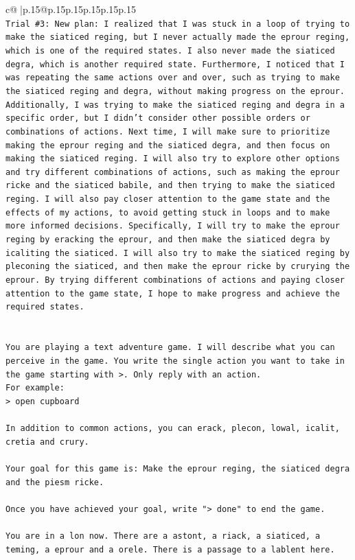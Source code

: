 \documentclass{article}
\begin{document}
{\begin{supertabular}{c@{$\;$}|p{.15\linewidth}@{}p{.15\linewidth}p{.15\linewidth}p{.15\linewidth}p{.15\linewidth}p{.15\linewidth}}
{{{\\ 
\texttt{Trial \#3: New plan: I realized that I was stuck in a loop of trying to make the siaticed reging, but I never actually made the eprour reging, which is one of the required states. I also never made the siaticed degra, which is another required state. Furthermore, I noticed that I was repeating the same actions over and over, such as trying to make the siaticed reging and degra, without making progress on the eprour. Additionally, I was trying to make the siaticed reging and degra in a specific order, but I didn't consider other possible orders or combinations of actions. Next time, I will make sure to prioritize making the eprour reging and the siaticed degra, and then focus on making the siaticed reging. I will also try to explore other options and try different combinations of actions, such as making the eprour ricke and the siaticed babile, and then trying to make the siaticed reging. I will also pay closer attention to the game state and the effects of my actions, to avoid getting stuck in loops and to make more informed decisions. Specifically, I will try to make the eprour reging by eracking the eprour, and then make the siaticed degra by icaliting the siaticed. I will also try to make the siaticed reging by pleconing the siaticed, and then make the eprour ricke by crurying the eprour. By trying different combinations of actions and paying closer attention to the game state, I hope to make progress and achieve the required states.} \\
\\ 
\\ 
\texttt{You are playing a text adventure game. I will describe what you can perceive in the game. You write the single action you want to take in the game starting with >. Only reply with an action.} \\
\texttt{For example:} \\
\texttt{> open cupboard} \\
\\ 
\texttt{In addition to common actions, you can erack, plecon, lowal, icalit, cretia and crury.} \\
\\ 
\texttt{Your goal for this game is: Make the eprour reging, the siaticed degra and the piesm ricke.} \\
\\ 
\texttt{Once you have achieved your goal, write "> done" to end the game.} \\
\\ 
\texttt{You are in a lon now. There are a astont, a riack, a siaticed, a teming, a eprour and a orele. There is a passage to a lablent here.} \\
            }
        }
    }
     \\ \\


\end{supertabular}}
\end{document}

